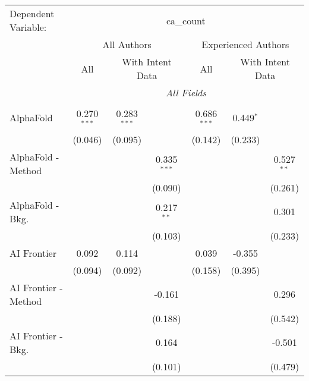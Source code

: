 \begingroup
\centering
\begin{tabular}{lcccccc}
   \tabularnewline \midrule \midrule
   Dependent Variable: & \multicolumn{6}{c}{ca\_count}\\
 & \multicolumn{3}{c}{All Authors} & \multicolumn{3}{c}{Experienced Authors} \\
\cmidrule(lr){2-4} \cmidrule(lr){5-7}
 & \multicolumn{1}{c}{All} & \multicolumn{2}{c}{With Intent Data} & \multicolumn{1}{c}{All} & \multicolumn{2}{c}{With Intent Data} \\
\cmidrule(lr){2-2} \cmidrule(lr){3-4} \cmidrule(lr){5-5} \cmidrule(lr){6-7}
 & \multicolumn{6}{c}{\textit{All Fields}} \\ \\
   AlphaFold            & 0.270$^{***}$ & 0.283$^{***}$ &               & 0.686$^{***}$ & 0.449$^{*}$   &   \\   
                        & (0.046)       & (0.095)       &               & (0.142)       & (0.233)       &   \\   
   AlphaFold - Method   &               &               & 0.335$^{***}$ &               &               & 0.527$^{**}$\\   
                        &               &               & (0.090)       &               &               & (0.261)\\   
   AlphaFold - Bkg.     &               &               & 0.217$^{**}$  &               &               & 0.301\\   
                        &               &               & (0.103)       &               &               & (0.233)\\   
   AI Frontier          & 0.092         & 0.114         &               & 0.039         & -0.355        &   \\   
                        & (0.094)       & (0.092)       &               & (0.158)       & (0.395)       &   \\   
   AI Frontier - Method &               &               & -0.161        &               &               & 0.296\\   
                        &               &               & (0.188)       &               &               & (0.542)\\   
   AI Frontier - Bkg.   &               &               & 0.164         &               &               & -0.501\\   
                        &               &               & (0.101)       &               &               & (0.479)\\   

\end{tabular}
